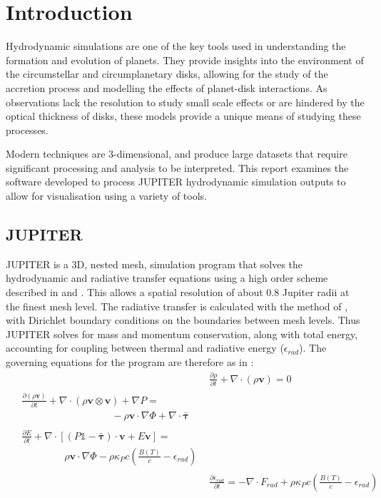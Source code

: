 \documentclass[preprint2]{aastex62}
\begin{document}
\section{Introduction}\label{sec:intro}
Hydrodynamic simulations are one of the key tools used in understanding the formation and evolution of planets. 
They provide insights into the environment of the circumstellar and circumplanetary disks, allowing for the study of the accretion process and modelling the effects of planet-disk interactions.
As observations lack the resolution to study small scale effects or are hindered by the optical thickness of disks, these models provide a unique means of studying these processes. 

Modern techniques are 3-dimensional, and produce large datasets that require significant processing and analysis to be interpreted.
This report examines the software developed to process JUPITER hydrodynamic simulation outputs to allow for visualisation using a variety of tools.
\subsection{JUPITER}\label{sec:jup}
JUPITER is a 3D, nested mesh, simulation program that solves the hydrodynamic and radiative transfer equations using a high order \cite{MR0119433} scheme described in \cite{Szulagyi2016} \cite{Szulagyi2014} and \cite{DeVal-Borro2006}. 
This allows a spatial resolution of about 0.8 Jupiter radii at the finest mesh level. 
The radiative transfer is calculated with the method of \cite{comm2011}, with Dirichlet boundary conditions on the boundaries between mesh levels.
Thus JUPITER solves for mass and momentum conservation, along with total energy, accounting for coupling between thermal and radiative energy ($\epsilon_{rad}$). The governing equations for the program are therefore as in \cite{Szulagyi2016}:
\begin{align}\label{eqns:hydro}
&\frac{\partial\rho}{\partial t} + \nabla \cdot \left(\rho\mathbf{v}\right) = 0\\
\begin{split}
&\frac{\partial\left(\rho\mathbf{v}\right)}{\partial t} + \nabla \cdot \left(\rho\mathbf{v} \otimes \mathbf{v}\right) + \nabla P = \\&\qquad\qquad\qquad\quad\quad\quad-\rho\mathbf{v}\cdot\nabla\Phi + \nabla \cdot \bm{\bar{\tau}}
\end{split}\\
\begin{split}
&\frac{\partial E}{\partial t} + \nabla\cdot\left[\left(P \mathds{1}- \bm{\bar{\tau}} \right) \cdot \mathbf{v} + E\mathbf{v}\right] = \\&\qquad\qquad\;\rho \mathbf{v}\cdot\nabla\Phi - \rho\kappa_{P}c\left(\frac{B\left(T\right)}{c} - \epsilon_{rad}\right)
\end{split}\\
&\frac{\partial \epsilon_{rad}}{\partial t} = -\nabla \cdot F_{rad} + \rho\kappa_{P}c\left(\frac{B\left(T\right)}{c} - \epsilon_{rad}\right)
\end{align}
\end{document}
